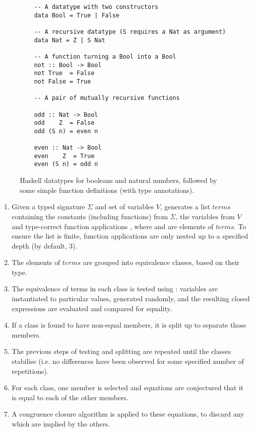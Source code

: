 \begin{figure}
  \centering
  \begin{verbatim}
    -- A datatype with two constructors
    data Bool = True | False

    -- A recursive datatype (S requires a Nat as argument)
    data Nat = Z | S Nat

    -- A function turning a Bool into a Bool
    not :: Bool -> Bool
    not True  = False
    not False = True

    -- A pair of mutually recursive functions

    odd :: Nat -> Bool
    odd    Z  = False
    odd (S n) = even n

    even :: Nat -> Bool
    even    Z  = True
    even (S n) = odd n
  \end{verbatim}
  \caption{Haskell datatypes for booleans and natural numbers, followed by some
    simple function definitions (with type annotations).}
  \label{fig:haskellexample}
\end{figure}

\begin{enumerate}
\item Given a typed signature $\Sigma$ and set of variables $V$, \qspec{}
  generates a list $terms$ containing the constants (including functions) from
  $\Sigma$, the variables from $V$ and type-correct function applications
  , where  and  are elements of $terms$. To ensure the list
  is finite, function applications are only nested up to a specified depth (by
  default, 3).
\item The elements of $terms$ are grouped into equivalence classes, based on
  their type.
\item The equivalence of terms in each class is tested using \qcheck{}:
  variables are instantiated to particular values, generated randomly, and the
  resulting closed expressions are evaluated and compared for equality.
\item If a class is found to have non-equal members, it is split up to separate
  those members.
\item The previous steps of testing and splitting are repeated until the classes
  stabilise (i.e. no differences have been observed for some specified number of
  repetitions).
\item For each class, one member is selected and equations are conjectured that
  it is equal to each of the other members.
\item A congruence closure algorithm is applied to these equations, to discard
  any which are implied by the others.
\end{enumerate}

